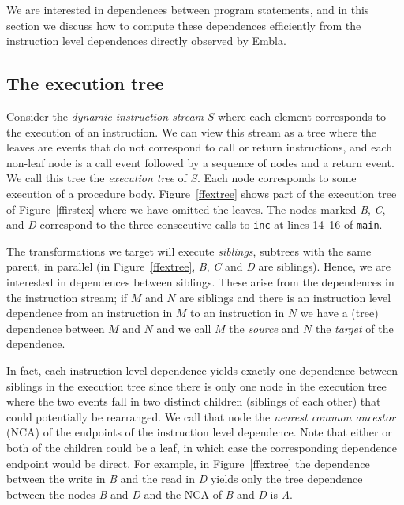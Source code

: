 \documentclass{acm_proc_article-sp}
\begin{document}
We are interested in dependences between program statements, and in 
this section we discuss how to compute these dependences efficiently from
the instruction level dependences directly observed by Embla.

\subsection{The execution tree}

Consider the {\em dynamic instruction stream} $S$ where each element 
corresponds to the execution
of an instruction. We can view this stream as a tree where the leaves are 
events that do not correspond to call or return instructions, and each 
non-leaf node is a call
event followed by a sequence of nodes and a return event. We call
this tree the {\em execution tree} of $S$. 
Each node corresponds to some execution of a procedure body.
Figure~\ref{ffextree} shows part of
the execution tree of Figure~\ref{ffirstex} where we have omitted the 
leaves. The nodes marked {\it B}, {\it C}, and {\it D} correspond to 
the three consecutive calls to {\tt inc} at lines 14--16 of {\tt main}.

The transformations we target will execute {\em siblings}, subtrees with
the same parent, in parallel (in Figure~\ref{ffextree}, {\it B}, {\it C} 
and {\it D} are siblings).  Hence, we 
are interested in dependences between siblings. These
arise from the 
dependences in the instruction stream; if $M$ and $N$ are siblings and
there is an instruction level dependence from an instruction in $M$ 
to an instruction in $N$ we have a (tree) dependence between $M$ and $N$
and we call $M$ the {\em source} and $N$ the {\em target} of the dependence.

In fact, each instruction level dependence yields exactly one dependence
between siblings in the execution tree since there is only one node
in the execution tree  
where the two events fall in two distinct children (siblings of each other)
that could potentially be rearranged. We call that node the {\em nearest
common ancestor} (NCA) of the endpoints of the instruction level dependence.
Note that either or both of the children could be a leaf, in which case the
corresponding dependence endpoint would be direct.
For example, in Figure~\ref{ffextree}
the dependence between the write in {\it B} and the read in {\it D} yields
only the tree dependence between the nodes {\it B} and {\it D} and the NCA of
{\it B} and {\it D} is {\it A}. 
\end{document}
